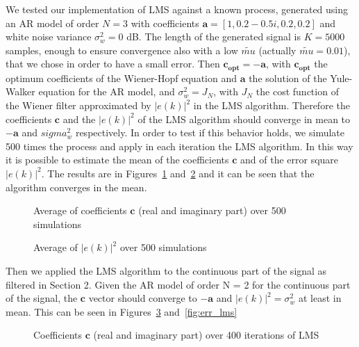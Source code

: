 \documentclass[10pt]{article}
\numberwithin{equation}{section}
\begin{document}
We tested our implementation of LMS against a known process, generated using an AR model of order $N = 3$ with coefficients $\mathbf{a} = [1, 0.2-0.5i, 0.2, 0.2]$ and white noise variance $\sigma_w^2 = 0$ dB. The length of the generated signal is $K = 5000$ samples, enough to ensure convergence also with a low $\tilde{mu}$ (actually $\tilde{mu} = 0.01$), that we chose in order to have a small error. Then $\mathbf{c_{opt}} = -\mathbf{a}$, with $\mathbf{c_{opt}}$ the optimum coefficients  of the Wiener-Hopf equation and $\mathbf{a}$ the solution of the Yule-Walker equation for the AR model, and $\sigma_w^2 = J_N$, with $J_N$ the cost function of the Wiener filter approximated by $|e(k)|^2$ in the LMS algorithm. Therefore the coefficients $\mathbf{c}$ and the $|e(k)|^2$ of the LMS algorithm should converge in mean to $-\mathbf{a}$ and $sigma_w^2$ respectively.
In order to test if this behavior holds, we simulate 500 times the process and apply in each iteration the LMS algorithm. In this way it is possible to estimate the mean of the coefficients $\mathbf{c}$ and of the error square $|e(k)|^2$. The results are in Figures~\ref{fig:coeff_lms_test} and~\ref{fig:err_lms_test} and it can be seen that the algorithm converges in the mean.

\begin{figure}[h!]
  \caption{Average of coefficients $\mathbf{c}$ (real and imaginary part) over 500 simulations}
  \label{fig:coeff_lms_test}
\end{figure}

\begin{figure}[h!]

  \caption{Average of $|e(k)|^2$ over 500 simulations}
  \label{fig:err_lms_test}
\end{figure}


Then we applied the LMS algorithm to the continuous part of the signal as filtered in Section 2. Given the AR model of order N = 2 for the continuous part of the signal, the $\mathbf{c}$ vector should converge to $-\mathbf{a}$ and $|e(k)|^2 = \sigma_w^2$ at least in mean. This can be seen in Figures~\ref{fig:coeff_lms} and~\ref{fig:err_lms}

\begin{figure}[h!]
  \caption{Coefficients $\mathbf{c}$ (real and imaginary part) over 400 iterations of LMS}
  \label{fig:coeff_lms}
\end{figure}
\end{document}
